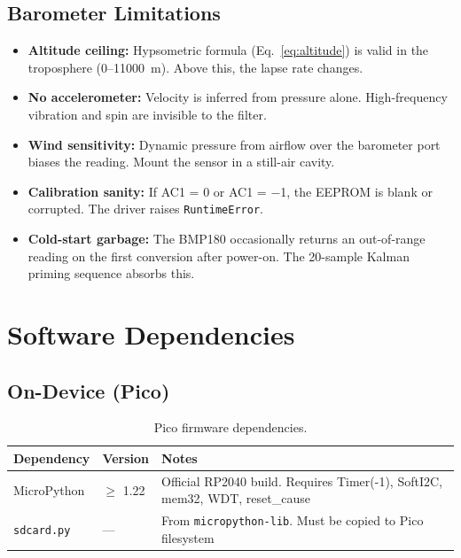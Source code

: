 \documentclass[11pt, a4paper, twoside]{article}
\begin{document}
\subsection{Barometer Limitations}

\begin{itemize}
    \item \textbf{Altitude ceiling:} Hypsometric formula (Eq.~\ref{eq:altitude}) is valid in the troposphere (0--\SI{11000}{\metre}). Above this, the lapse rate changes.
    \item \textbf{No accelerometer:} Velocity is inferred from pressure alone. High-frequency vibration and spin are invisible to the filter.
    \item \textbf{Wind sensitivity:} Dynamic pressure from airflow over the barometer port biases the reading. Mount the sensor in a still-air cavity.
    \item \textbf{Calibration sanity:} If AC1 = 0 or AC1 = $-$1, the EEPROM is blank or corrupted. The driver raises \texttt{RuntimeError}.
    \item \textbf{Cold-start garbage:} The BMP180 occasionally returns an out-of-range reading on the first conversion after power-on. The 20-sample Kalman priming sequence absorbs this.
\end{itemize}

\section{Software Dependencies}
\label{sec:dependencies}

\subsection{On-Device (Pico)}

\begin{table}[ht]
\centering
\caption{Pico firmware dependencies.}
\label{tab:pico-deps}
\begin{tabularx}{\textwidth}{l l X}
\toprule
\textbf{Dependency} & \textbf{Version} & \textbf{Notes} \\
\midrule
MicroPython & $\geq$ 1.22 & Official RP2040 build. Requires Timer(-1), SoftI2C, mem32, WDT, reset\_cause \\
\texttt{sdcard.py} & --- & From \texttt{micropython-lib}. Must be copied to Pico filesystem \\
\bottomrule
\end{tabularx}
\end{table}
\end{document}
